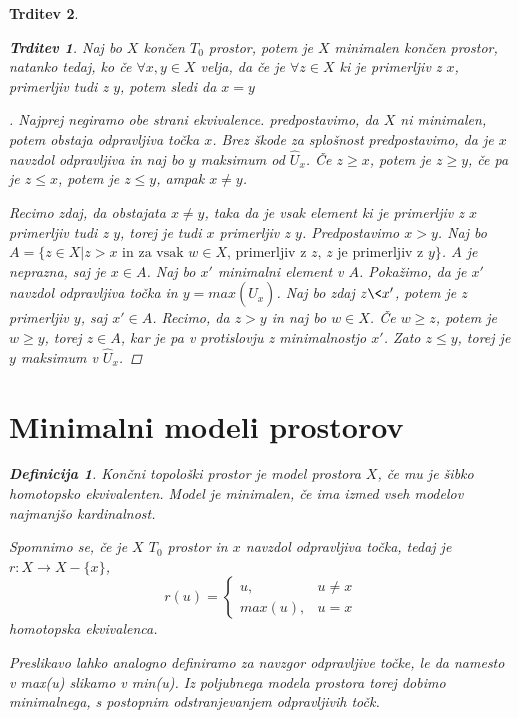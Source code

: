 \documentclass[a4paper,12pt]{article}
\theoremstyle{definition}
\newtheorem{definicija}{Definicija}
\theoremstyle{plain}
\theoremstyle{definition}
\theoremstyle{plain}
\newtheorem{trditev}{Trditev}
\theoremstyle{plain}
\theoremstyle{plain}
\theoremstyle{plain}
\newenvironment{dokaz}{\begin{proof}[\bfseries\upshape\proofname]}{\end{proof}}
\begin{document}
\begin{trditev}
\begin{trditev}
Naj bo $X$ končen $T_0$ prostor, potem je $X$ minimalen končen prostor, natanko tedaj, ko če $\forall x,y\in X$ velja, da če je  $\forall z\in X$ ki je primerljiv z $x$, primerljiv tudi z $y$, potem sledi da $x=y$
\end{trditev}

\begin{dokaz}
    Najprej negiramo obe strani ekvivalence. predpostavimo, da $X$ ni minimalen, potem obstaja odpravljiva točka $x$. Brez škode za splošnost predpostavimo, da je $x$ navzdol odpravljiva in naj bo $y$ maksimum od $\hat{U}_x$. Če $z\geq x$, potem je $z\geq y$, če pa je $z\le x$, potem je $z\leq y$, ampak $x\neq y$.

    Recimo zdaj, da obstajata $x\neq y$, taka da je vsak 
    element ki je primerljiv z $x$ primerljiv tudi z $y$, 
    torej je tudi $x$ primerljiv z $y$. Predpostavimo 
    $x>y$. Naj bo $A=\{z\in X |  z>x \text{ in za vsak $w\in 
    X$, primerljiv z $z$, $z$ je primerljiv z $y$}\}$. $A$ 
    je neprazna, saj je $x\in A$. Naj bo $x'$ minimalni 
    element v $A$. Pokažimo, da je $x'$ navzdol odpravljiva 
    točka in $y=max(\hat{U}_x)$. Naj bo zdaj $z\<x'$, potem 
    je $z$ primerljiv $y$, saj $x'\in A$. Recimo, da $z>y$ 
    in naj bo $w\in X$. Če $w\geq z$, potem je $w\geq y$, 
    torej $z\in A$, kar je pa v protislovju z minimalnostjo 
    $x'$. Zato $z\leq y$, torej je $y$ maksimum v 
    $\hat{U}_x$.
\end{dokaz}

\section{Minimalni modeli prostorov}

\begin{definicija}
    Končni topološki prostor je \textit{model} prostora $X$, če mu je šibko homotopsko ekvivalenten. Model je \textit{minimalen}, če ima izmed vseh modelov najmanjšo kardinalnost.
\end{definicija}

Spomnimo se, če je $X$ $T_0$ prostor in $x$ navzdol odpravljiva točka, tedaj je $r: X \rightarrow X - \{x\}$, $$
r(u) = \begin{cases}
    u, & u \neq x \\
    max(u), & u = x
\end{cases}$$
homotopska ekvivalenca.

Preslikavo lahko analogno definiramo za navzgor odpravljive točke, le da namesto v \textit{max(u)} slikamo v \textit{min(u)}. 
Iz poljubnega modela prostora torej dobimo minimalnega, s postopnim odstranjevanjem odpravljivih točk.



\end{trditev}
\end{document}
